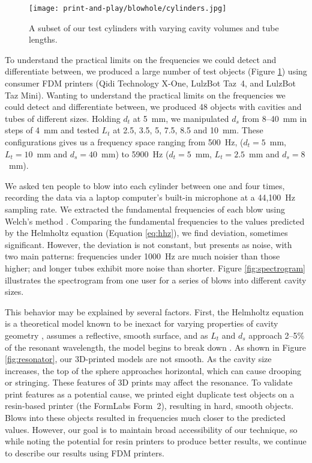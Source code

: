       \begin{figure}
        \centering
        \texttt{[image: print-and-play/blowhole/cylinders.jpg]}
        \caption{A subset of our test cylinders with varying cavity volumes and
          tube lengths.}
        \label{fig:cylinders}
      \end{figure}
      
      To understand the practical limits on the frequencies we could detect and
      differentiate between, we produced a large number of test objects (Figure
      \ref{fig:cylinders}) using consumer FDM printers (Qidi Technology X-One,
      LulzBot Taz~4, and LulzBot Taz Mini). Wanting to understand the practical
      limits on the frequencies we could detect and differentiate between, we
      produced 48 objects with cavities and tubes of different sizes. Holding
      $d_t$ at 5~mm, we manipulated $d_s$ from 8--40~mm in steps of 4~mm and
      tested $L_t$ at 2.5, 3.5, 5, 7.5, 8.5 and 10~mm. These configurations
      gives us a frequency space ranging from 500~Hz, ($d_t=5$~mm, $L_t=10$~mm
      and $d_s=40$~mm) to 5900~Hz ($d_t=5$~mm, $L_t=2.5$~mm and $d_s=8$~mm).
          
      We asked ten people to blow into each cylinder between one and four times,
      recording the data via a laptop computer's built-in microphone at a
      44,100~Hz sampling rate. We extracted the fundamental frequencies of each
      blow using Welch's method \cite{Welch:1967jw}. Comparing the fundamental
      frequencies to the values predicted by the Helmholtz equation (Equation
      \ref{eq:hhz}), we find deviation, sometimes significant. However, the
      deviation is not constant, but presents as noise, with two main patterns:
      frequencies under 1000~Hz are much noisier than those higher; and longer
      tubes exhibit more noise than shorter. Figure \ref{fig:spectrogram}
      illustrates the spectrogram from one user for a series of blows into
      different cavity sizes.

      This behavior may be explained by several factors. First, the Helmholtz
      equation is a theoretical model known to be inexact for varying properties
      of cavity geometry \cite{Selamet:1995kv, Alster:1972ha}, assumes a
      reflective, smooth surface, and  as $L_t$ and $d_s$ approach 2--5\% of the
      resonant wavelength, the model begins to break down \cite{Selamet:1995kv}.
      As shown in Figure \ref{fig:resonator}, our 3D-printed models are not
      smooth. As the cavity size increases, the top of the sphere approaches
      horizontal, which can cause drooping or stringing. These features of 3D
      prints may affect the resonance. To validate print features as a potential
      cause, we printed eight duplicate test objects on a resin-based printer
      (the FormLabs Form~2), resulting in hard, smooth objects. Blows into these
      objects resulted in frequencies much closer to the predicted values.
      However, our goal is to maintain broad accessibility of our technique, so
      while noting the potential for resin printers to produce better results,
      we continue to describe our results using FDM printers.
      
